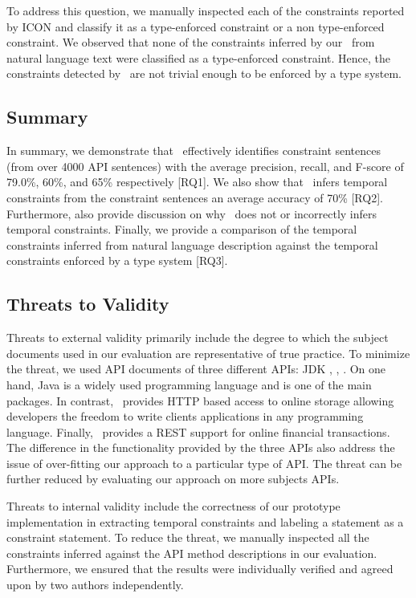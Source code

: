 To address this question, we manually inspected each of the constraints reported by ICON and classify it as a type-enforced constraint or a non type-enforced constraint. 
We observed that none of the constraints inferred by our \tool\ from natural language text were classified as a type-enforced constraint.
Hence, the constraints detected by \tool\ are not trivial enough to be enforced by a type system.




\subsection{Summary}
\label{sub:summary}

In summary, we demonstrate that \tool\ effectively identifies constraint sentences (from over 4000 API sentences) with the average precision, recall, and F-score of 79.0\%, 60\%, and 65\% respectively [RQ1]. We also show that \tool\ infers temporal constraints from the constraint sentences an average accuracy of 70\% [RQ2]. Furthermore, also provide discussion on why \tool\ does not or incorrectly infers temporal constraints. Finally, we provide a comparison of the temporal constraints inferred from natural language description against the temporal constraints enforced by a type system [RQ3]. 


\subsection{Threats to Validity}
\label{sub:threats_to_validity}
Threats to external validity primarily include the degree to which the subject documents used in our evaluation are representative of true practice. To minimize the threat, we used API documents of three different APIs: JDK , \amazonAPI, \paypalAPI. On one hand, Java is a widely used programming language and  is one of the main packages. In contrast, \amazonAPI\ provides HTTP based access to online storage allowing developers the freedom to write clients applications in any programming language. Finally, \paypalAPI\ provides a REST support for online financial transactions. The difference in the functionality provided by the three APIs also address the issue of over-fitting our approach to a particular type of API. The threat can be further reduced by evaluating our approach on more subjects APIs. 

Threats to internal validity include the correctness of our prototype implementation in extracting temporal constraints and labeling a statement as a constraint statement. To reduce the threat, we manually inspected all the constraints inferred against the API method descriptions in our evaluation. Furthermore, we ensured that the results were individually verified and agreed upon by two authors independently.




